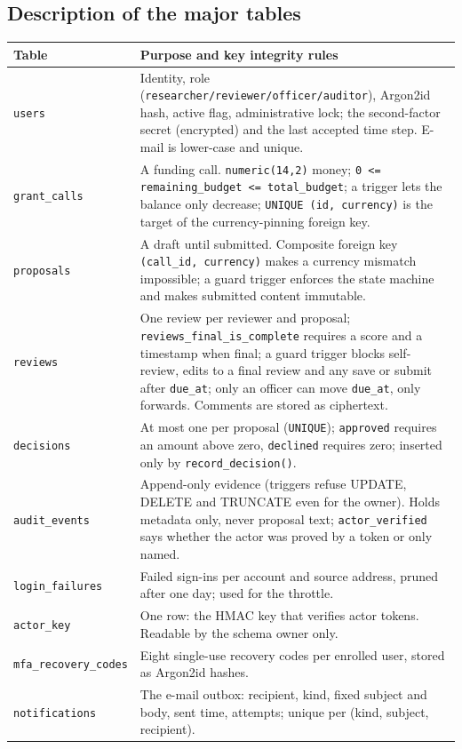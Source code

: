 \documentclass[10pt,a4paper]{article}
\newcommand{\code}[1]{\nolinkurl{#1}}
\newcommand{\tcap}[1]{\captionof{table}{#1}\nopagebreak[4]\vspace{-3pt}}
\begin{document}
\subsection{Description of the major tables}
\tcap{Description of the major tables}
\begin{center}\small
\begin{tabularx}{\linewidth}{@{}L{2.7cm}Y@{}}
\toprule\textbf{Table} & \textbf{Purpose and key integrity rules}\\\midrule
\code{users} & Identity, role (\code{researcher/reviewer/officer/auditor}), Argon2id hash, active flag, administrative lock; the second-factor secret (encrypted) and the last accepted time step. E-mail is lower-case and unique.\\
\code{grant_calls} & A funding call. \code{numeric(14,2)} money; \code{0 <= remaining_budget <= total_budget}; a trigger lets the balance only decrease; \code{UNIQUE (id, currency)} is the target of the currency-pinning foreign key.\\
\code{proposals} & A draft until submitted. Composite foreign key \code{(call_id, currency)} makes a currency mismatch impossible; a guard trigger enforces the state machine and makes submitted content immutable.\\
\code{reviews} & One review per reviewer and proposal; \code{reviews_final_is_complete} requires a score and a timestamp when final; a guard trigger blocks self-review, edits to a final review and any save or submit after \code{due_at}; only an officer can move \code{due_at}, only forwards. Comments are stored as ciphertext.\\
\code{decisions} & At most one per proposal (\code{UNIQUE}); \code{approved} requires an amount above zero, \code{declined} requires zero; inserted only by \code{record_decision()}.\\
\code{audit_events} & Append-only evidence (triggers refuse UPDATE, DELETE and TRUNCATE even for the owner). Holds metadata only, never proposal text; \code{actor_verified} says whether the actor was proved by a token or only named.\\
\code{login_failures} & Failed sign-ins per account and source address, pruned after one day; used for the throttle.\\
\code{actor_key} & One row: the HMAC key that verifies actor tokens. Readable by the schema owner only.\\
\code{mfa_recovery_codes} & Eight single-use recovery codes per enrolled user, stored as Argon2id hashes.\\
\code{notifications} & The e-mail outbox: recipient, kind, fixed subject and body, sent time, attempts; unique per (kind, subject, recipient).\\
\bottomrule\end{tabularx}\end{center}
\end{document}
